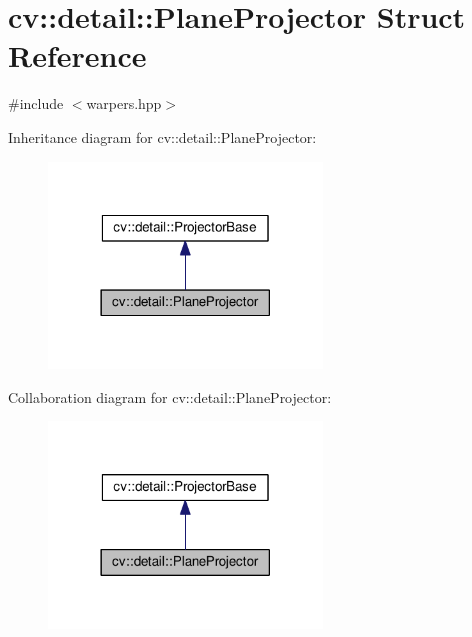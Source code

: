 \hypertarget{structcv_1_1detail_1_1PlaneProjector}{\section{cv\-:\-:detail\-:\-:Plane\-Projector Struct Reference}
\label{structcv_1_1detail_1_1PlaneProjector}
}


{\ttfamily \#include $<$warpers.\-hpp$>$}



Inheritance diagram for cv\-:\-:detail\-:\-:Plane\-Projector\-:\nopagebreak
\begin{figure}[H]
\begin{center}
\leavevmode
\includegraphics[width=206pt]{structcv_1_1detail_1_1PlaneProjector__inherit__graph}
\end{center}
\end{figure}


Collaboration diagram for cv\-:\-:detail\-:\-:Plane\-Projector\-:\nopagebreak
\begin{figure}[H]
\begin{center}
\leavevmode
\includegraphics[width=206pt]{structcv_1_1detail_1_1PlaneProjector__coll__graph}
\end{center}
\end{figure}
